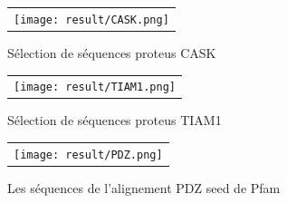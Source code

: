     \clearpage

   \begin{figure}[t]
     \centering
     \begin{tabular}{c}
       \texttt{[image: result/CASK.png]} \\
     \end{tabular}
     \caption{Sélection de séquences proteus CASK }
\label{result:CASK}
   \end{figure}

   \begin{figure}[t]
     \centering
     \begin{tabular}{c}
       \texttt{[image: result/TIAM1.png]} \\
     \end{tabular}
     \caption{Sélection de séquences proteus TIAM1 }
\label{result:TIAM1}
   \end{figure}

    \clearpage


   \begin{figure}[t]
     \centering
     \begin{tabular}{c}
       \texttt{[image: result/PDZ.png]} \\
     \end{tabular}
     \caption{Les séquences de l'alignement PDZ seed de Pfam}
\label{result:PDZ_seed}
   \end{figure}

